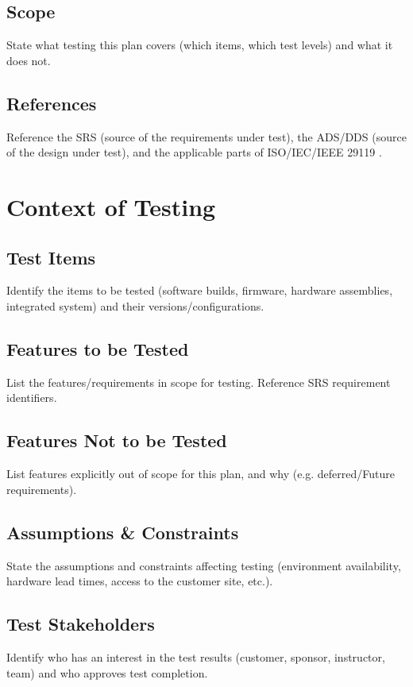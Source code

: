 \documentclass[11pt,letterpaper]{article}
\begin{document}
\subsection{Scope}
State what testing this plan covers (which items, which test levels) and what it does not.

\subsection{References}
Reference the SRS (source of the requirements under test), the ADS/DDS (source of the design under test), and the applicable parts of ISO/IEC/IEEE 29119 \cite{ISO29119part1, ISO29119part2, ISO29119part3, ISO29119part4}.

\section{Context of Testing}
\subsection{Test Items}
Identify the items to be tested (software builds, firmware, hardware assemblies, integrated system) and their versions/configurations.

\subsection{Features to be Tested}
List the features/requirements in scope for testing. Reference SRS requirement identifiers.

\subsection{Features Not to be Tested}
List features explicitly out of scope for this plan, and why (e.g. deferred/Future requirements).

\subsection{Assumptions \& Constraints}
State the assumptions and constraints affecting testing (environment availability, hardware lead times, access to the customer site, etc.).

\subsection{Test Stakeholders}
Identify who has an interest in the test results (customer, sponsor, instructor, team) and who approves test completion.
\end{document}
